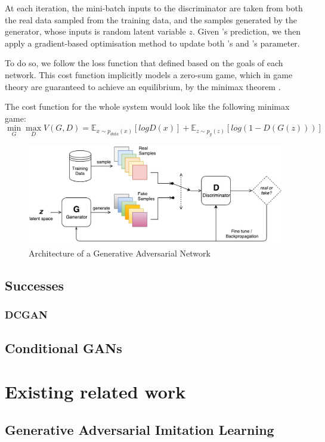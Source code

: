 At each iteration, the mini-batch inputs to the discriminator  are taken from both the real data sampled from the training data, and the samples generated by the generator, whose inputs is random latent variable $z$. Given 's prediction, we then apply a gradient-based optimisation method to update both 's and 's parameter.

To do so, we follow the loss function that defined based on the goals of each network. This cost function implicitly models a zero-sum game, which in game theory are guaranteed to achieve an equilibrium, by the minimax theorem \citep{du2013minimax}.

The cost function for the whole system would look like the following minimax game:
\[\min_{G} \max_{D} V(G, D) = \mathbb{E}_{x\sim p_{data}(x)}[log D(x)] + \mathbb{E}_{z \sim p_{g}(z)}[log(1-D(G(z)))] \]

\begin{figure}
\centering
\includegraphics[width=15cm]{Figures/VanillaGAN}
\caption{Architecture of a Generative Adversarial Network}
\label{fig:VanillaGAN}
\end{figure}

\subsection{Successes}
\label{successes}
\subsubsection{DCGAN}
\subsection{Conditional GANs}


\section{Existing related work}
\subsection{Generative Adversarial Imitation Learning}

